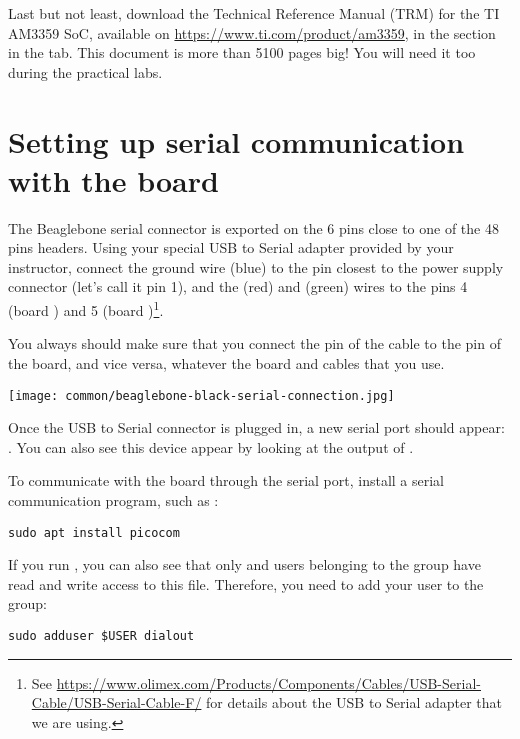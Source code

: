 Last but not least, download the Technical Reference Manual (TRM) for
the TI AM3359 SoC, available on \url{https://www.ti.com/product/am3359},
in the  section in the  tab.
This document is more than 5100 pages big! You will need it
too during the practical labs.

\section{Setting up serial communication with the board}

The Beaglebone serial connector is exported on the 6 pins close to one
of the 48 pins headers. Using your special USB to Serial adapter provided
by your instructor, connect the ground wire (blue) to the pin closest
to the power supply connector (let's call it pin 1), and the  (red)
and  (green) wires to the pins 4 (board ) and
5 (board )\footnote{See
\url{https://www.olimex.com/Products/Components/Cables/USB-Serial-Cable/USB-Serial-Cable-F/}
for details about the USB to Serial adapter that we are using.}.

You always should make sure that you connect the  pin of the cable
to the  pin of the board, and vice versa, whatever the board and
cables that you use.

\begin{center}
\texttt{[image: common/beaglebone-black-serial-connection.jpg]}
\end{center}

Once the USB to Serial connector is plugged in, a new serial port
should appear: .  You can also see this device
appear by looking at the output of .

To communicate with the board through the serial port, install a
serial communication program, such as :

\begin{verbatim}
sudo apt install picocom
\end{verbatim}

If you run , you can also see that only
 and users belonging to the  group have
read and write access to this file. Therefore, you need to add your user
to the  group:

\begin{verbatim}
sudo adduser $USER dialout
\end{verbatim}


